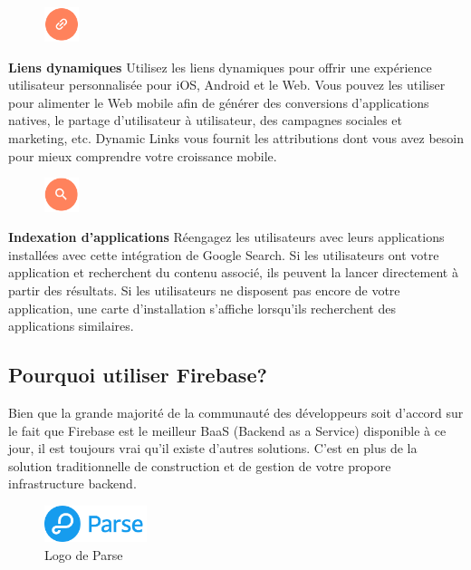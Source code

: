 \begin{figure}
	\includegraphics[width=1cm]{Images/chapter2/firebase_services/dynamic_links.png}
\end{figure}
\textbf{Liens dynamiques} Utilisez les liens dynamiques pour offrir une expérience utilisateur personnalisée pour iOS, Android et le Web. Vous pouvez les utiliser pour alimenter le Web mobile afin de générer des conversions d'applications natives, le partage d'utilisateur à utilisateur, des campagnes sociales et marketing, etc. Dynamic Links vous fournit les attributions dont vous avez besoin pour mieux comprendre votre croissance mobile.\medskip

\begin{figure}
	\includegraphics[width=1cm]{Images/chapter2/firebase_services/app_indexing.png}
\end{figure}
\textbf{Indexation d'applications} Réengagez les utilisateurs avec leurs applications installées avec cette intégration de Google Search. Si les utilisateurs ont votre application et recherchent du contenu associé, ils peuvent la lancer directement à partir des résultats. Si les utilisateurs ne disposent pas encore de votre application, une carte d'installation s'affiche lorsqu'ils recherchent des applications similaires.\medskip

\subsection{Pourquoi utiliser Firebase?}
Bien que la grande majorité de la communauté des développeurs soit d’accord sur le fait que Firebase est le meilleur BaaS (Backend as a Service) disponible à ce jour, il est toujours vrai qu’il existe d’autres solutions. C’est en plus de la solution traditionnelle de construction et de gestion de votre propore infrastructure backend.

\begin{figure}
	\includegraphics[width=3cm]{Images/chapter2/parse_logo.png}
	\caption{{\footnotesize Logo de Parse}}
\end{figure}

